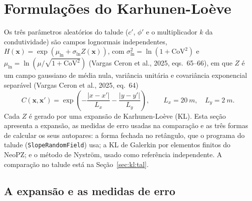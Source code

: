 \section{Formulações do Karhunen-Loève}\label{sec:kl:form}

Os três parâmetros aleatórios do talude ($c'$, $\phi'$ e o multiplicador $k$ da condutividade) são campos lognormais
independentes, $H(\mathbf{x}) = \exp\left(\mu_{\ln} + \sigma_{\ln} Z(\mathbf{x})\right)$, com
$\sigma_{\ln}^2 = \ln(1 + \mathrm{CoV}^2)$ e $\mu_{\ln} = \ln\left(\mu / \sqrt{1 + \mathrm{CoV}^2}\right)$
(Vargas Ceron et al., 2025, eqs.~65--66), em que $Z$ é um campo gaussiano de média nula, variância unitária e covariância
exponencial separável (Vargas Ceron et al., 2025, eq.~64)
\begin{equation}
  C(\mathbf{x}, \mathbf{x}') = \exp\left(-\frac{|x - x'|}{L_x} - \frac{|y - y'|}{L_y}\right),
  \qquad L_x = \SI{20}{m}, \quad L_y = \SI{2}{m}.
  \label{eq:kl:nucleo}
\end{equation}
Cada $Z$ é gerado por uma expansão de Karhunen-Loève (KL). Esta seção apresenta a expansão, as medidas de erro usadas
na comparação e as três formas de calcular os seus autopares: a forma fechada no retângulo, que o programa do talude
(\texttt{SlopeRandomField}) usa; a KL de Galerkin por elementos finitos do NeoPZ; e o método de Nyström, usado como
referência independente. A comparação no talude está na Seção~\ref{sec:kl:tal}.

\subsection{A expansão e as medidas de erro}\label{kl:form:erro}

